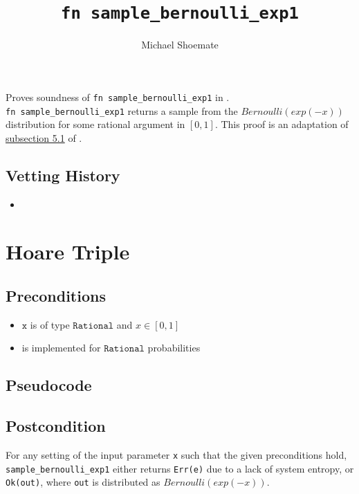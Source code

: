 \documentclass{article}
\title{\texttt{fn sample\_bernoulli\_exp1}}
\author{Michael Shoemate}
\begin{document}
\maketitle

\contrib
Proves soundness of \texttt{fn sample\_bernoulli\_exp1} in .\\
\texttt{fn sample\_bernoulli\_exp1} returns a sample from the $Bernoulli(exp(-x))$ distribution for some rational argument in $[0, 1]$.
This proof is an adaptation of \href{https://arxiv.org/pdf/2004.00010.pdf#subsection.5.1}{subsection 5.1} of \cite{CKS20}.

\subsection*{Vetting History}
\begin{itemize}
    \item {}
\end{itemize}

\section{Hoare Triple}
\subsection*{Preconditions}
\begin{itemize}
    \item $\texttt{x}$ is of type $\texttt{Rational}$ and $x \in [0, 1]$
    \item {} is implemented for $\texttt{Rational}$ probabilities
\end{itemize}


\subsection*{Pseudocode}


\subsection*{Postcondition}
\label{postcondition}
For any setting of the input parameter \texttt{x} such that the given preconditions hold, \\
\texttt{sample\_bernoulli\_exp1} either returns \texttt{Err(e)} due to a lack of system entropy,
or \texttt{Ok(out)}, where \texttt{out} is distributed as $Bernoulli(exp(-x))$.
\end{document}
